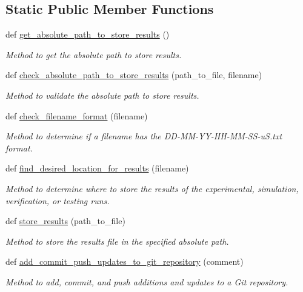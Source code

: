 \subsection*{Static Public Member Functions}
\begin{DoxyCompactItemize}
\item 
def \hyperlink{classutilities_1_1miscellaneous_1_1misc_a17714d8ce76a7c4f04256b37b9938c15}{get\+\_\+absolute\+\_\+path\+\_\+to\+\_\+store\+\_\+results} ()
\begin{DoxyCompactList}\small\item\em Method to get the absolute path to store results. \end{DoxyCompactList}\item 
def \hyperlink{classutilities_1_1miscellaneous_1_1misc_a9b5ff2b3036d8a1a2e3bacb1d25e2785}{check\+\_\+absolute\+\_\+path\+\_\+to\+\_\+store\+\_\+results} (path\+\_\+to\+\_\+file, filename)
\begin{DoxyCompactList}\small\item\em Method to validate the absolute path to store results. \end{DoxyCompactList}\item 
def \hyperlink{classutilities_1_1miscellaneous_1_1misc_a96b7b4aa054c6c8eb7571314ec8edbc7}{check\+\_\+filename\+\_\+format} (filename)
\begin{DoxyCompactList}\small\item\em Method to determine if a filename has the D\+D-\/\+M\+M-\/\+Y\+Y-\/\+H\+H-\/\+M\+M-\/\+S\+S-\/u\+S.\+txt format. \end{DoxyCompactList}\item 
def \hyperlink{classutilities_1_1miscellaneous_1_1misc_ab675e34a1a463f5a6aac272debe372ae}{find\+\_\+desired\+\_\+location\+\_\+for\+\_\+results} (filename)
\begin{DoxyCompactList}\small\item\em Method to determine where to store the results of the experimental, simulation, verification, or testing runs. \end{DoxyCompactList}\item 
def \hyperlink{classutilities_1_1miscellaneous_1_1misc_ad364ae88435c58955e26fcc22b1cabb9}{store\+\_\+results} (path\+\_\+to\+\_\+file)
\begin{DoxyCompactList}\small\item\em Method to store the results file in the specified absolute path. \end{DoxyCompactList}\item 
def \hyperlink{classutilities_1_1miscellaneous_1_1misc_a7837597eba06ec38b69b931ec18e39eb}{add\+\_\+commit\+\_\+push\+\_\+updates\+\_\+to\+\_\+git\+\_\+repository} (comment)
\begin{DoxyCompactList}\small\item\em Method to add, commit, and push additions and updates to a Git repository. \end{DoxyCompactList}\end{DoxyCompactItemize}
